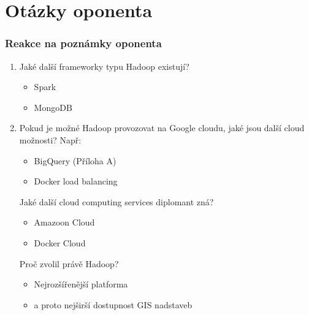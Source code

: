 \documentclass[unicode,bookmarksnumbered]{beamer}
\begin{document}
	\section{Otázky oponenta}
	\begin{frame}
		\frametitle{Reakce na poznámky oponenta}
		\small
		\begin{enumerate}
			\item Jaké další frameworky typu Hadoop existují?
			\begin{itemize}
			\item Spark
			\item MongoDB
			\end{itemize}

			\pause[]  
			
			\item Pokud je možné Hadoop provozovat na Google cloudu, jaké jsou další cloud možnosti? 
						Např:
						\begin{itemize}
							\item BigQuery (Příloha A)
							\item Docker load balancing
						\end{itemize}
						 Jaké další cloud computing services diplomant zná?
 						\begin{itemize}
 							\item Amazoon Cloud
 							\item Docker Cloud
 						\end{itemize}
							Proč zvolil právě Hadoop?
						\begin{itemize}
							\item Nejrozšířenější platforma
							\item a proto nejširší dostupnost GIS nadstaveb
						\end{itemize}
								\end{enumerate}
							\end{frame}
\end{document}
